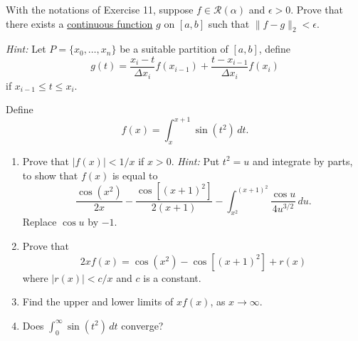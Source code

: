   \begin{exercise}[Rudin 6.12]
    With the notations of Exercise 11, suppose $f \in \mathscr{R}(\alpha)$ and $\epsilon > 0$. Prove that there exists a \hyperref[pst-def:continuous_func]{continuous function} $g$ on $[a, b]$ such that $\|f - g\|_2 < \epsilon$.
    \par \textit{Hint:} Let $P = \{x_0, \dots, x_n\}$ be a suitable partition of $[a, b]$, define
    \begin{equation}
      g(t) = \frac{x_i - t}{\Delta x_i} f(x_{i-1}) + \frac{t - x_{i-1}}{\Delta x_i} f(x_i)
    \end{equation}
    if $x_{i-1} \le t \le x_i$.
  \end{exercise}
  \begin{solution}

  \end{solution}

  \begin{exercise}[Rudin 6.13]
    Define
    \begin{equation}
      f(x) = \int_x^{x+1} \sin (t^2) \, dt.
    \end{equation}
    \begin{enumerate}
      \item[(a)] Prove that $|f(x)| < 1/x$ if $x > 0$. \textit{Hint:} Put $t^2 = u$ and integrate by parts, to show that $f(x)$ is equal to
      \begin{equation}
        \frac{\cos(x^2)}{2x} - \frac{\cos [(x+1)^2]}{2(x+1)} - \int_{x^2}^{(x+1)^2} \frac{\cos u}{4u^{3/2}} \, du.
      \end{equation}
      Replace $\cos u$ by $-1$.
      \item[(b)] Prove that
      \begin{equation}
        2xf(x) = \cos(x^2) - \cos[(x+1)^2] + r(x)
      \end{equation}
      where $|r(x)| < c/x$ and $c$ is a constant.
      \item[(c)] Find the upper and lower limits of $xf(x)$, as $x \to \infty$.
      \item[(d)] Does $\int_0^\infty \sin(t^2) \, dt$ converge?
    \end{enumerate}
  \end{exercise}
  \begin{solution}

  \end{solution}


